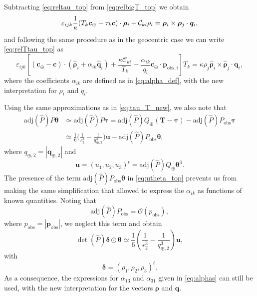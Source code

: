 \documentclass[11pt]{article}
\def\angmom{\bm{c}}
\def\angmom{{\bm{c}}}
\def\adj{\text{adj}}
\begin{document}
Subtracting \eqref{eq:reltau_top} from \eqref{eq:relbigT_top} we obtain
\begin{equation}
    \varepsilon_{ijk}\frac{1}{\kappa}(T_k\angmom_\oplus-\tau_k\angmom)\cdot\bm{\rho}_i + {\cal C}_{ki}\rho_i= 
    \bm{\rho}_i\times\bm{\rho}_j \cdot\bm{q}_i,
\label{eq:relTtau_top}
\end{equation}
and following the same procedure as in the geocentric case we can write \eqref{eq:relTtau_top} as 
\begin{equation}
    \varepsilon_{ijk}\left[\left(\bm{c}_\oplus-\bm{c}\right)\cdot
    \left(\hat{\bm{\rho}}_i+\alpha_{ik}\hat{\bm{q}}_i\right) + \frac{\kappa\mathcal{C}_{ki}}{T_k}-\frac{\alpha_{ik}}{q_i}\bm{c}_\oplus\cdot\bm{p}_{\text{obs},i}\right]T_k =
    \kappa\rho_j\hat{\bm{\rho}}_i\times\hat{\bm{\rho}}_j\cdot\bm{q}_i,
\label{eq:relTtau_top_new}
\end{equation}
where the coefficients $\alpha_{ik}$ are defined as in \eqref{eq:alpha_def}, with the new interpretation for $\rho_i$ and $q_i$.

Using the same approximations as in \eqref{eq:tau_T_new}, we also note that
\begin{equation}
    \begin{aligned}
        \adj(\hat{P})P\bm{\theta} & \simeq \adj(\hat{P})P\bm{\tau} = \adj(\hat{P})Q_\oplus(\bm{T}-\bm{\tau}) - \adj(\hat{P})P_\text{obs}\bm{\tau}\\
        &\simeq \frac{1}{6}\bigg(\frac{1}{r_2^3} - \frac{1}{q_{\oplus,2}^3}\bigg)\bm{u}
        - \adj(\hat{P})P_\text{obs}\bm{\theta},
    \end{aligned}
    \label{eq:utheta_top}
\end{equation}
where $q_{\oplus,2} = |\bm{q}_{\oplus,2}|$ and
\begin{equation*}
\bm{u} = (u_1,u_2,u_3)^t = \adj(\hat{P})Q_\oplus \bm{\theta}^3.
\end{equation*}
The presence of the term $\adj(\hat{P})P_\text{obs}\bm{\theta}$ in \eqref{eq:utheta_top} prevents us from making the same simplification that allowed to express the $\alpha_{ik}$ as functions of known quantities.  
Noting that
\begin{equation*}
    \adj(\hat{P})P_\text{obs} = \mathcal{O}(p_\text{obs}),
\end{equation*}
where $p_{\text{obs}} = |\bm{p}_{\text{obs}}|$, we neglect this term and obtain
\begin{equation*}
    \det(\hat{P})\bm{\delta}\odot\bm{\theta} \simeq \frac{1}{6}\left(\frac{1}{r_2^3}
    - \frac{1}{q_{\oplus,2}^3}\right) \bm{u},
\end{equation*}
with
\begin{equation*}
\bm{\delta} = (\rho_1,\rho_2,\rho_3)^t.
\end{equation*}
As a consequence, the expressions for $\alpha_{13}$ and $\alpha_{31}$ given in \eqref{eq:alphas} can still be used, with the new interpretation for the vectors $\bm{\rho}$ and $\bm{q}$.
\end{document}
